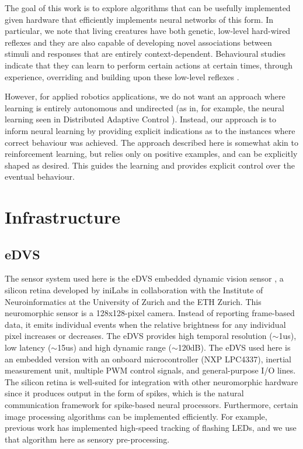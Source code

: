 \documentclass[conference]{IEEEtran}
\begin{document}
The goal of this work is to explore algorithms that can be usefully implemented
given hardware that efficiently implements neural networks of this form.  In
particular, we note that living creatures have both genetic, low-level 
hard-wired reflexes and they are also capable of developing novel associations 
between stimuli and responses that are entirely context-dependent. Behavioural 
studies indicate that they can learn to perform certain actions at certain 
times, through experience, overriding and building upon these low-level 
reflexes \cite{kim2007encoding}. 

However, for applied robotics applications, we do not want an approach where
learning is entirely autonomous and undirected (as in, for example, the neural
learning seen in Distributed Adaptive Control \cite{verschure2012distributed}). 
Instead, our approach is to inform neural learning by providing explicit
indications as to the instances where correct behaviour was achieved.  The 
approach described here is somewhat akin to reinforcement learning, but relies
only on positive examples, and can be explicitly shaped as desired.  This 
guides the learning and provides explicit control over the eventual behaviour. 

\section{Infrastructure}
\label{infrastructure}

\subsection{eDVS}
The sensor system used here is the eDVS embedded dynamic vision 
sensor \cite{conradt2009embedded}, a silicon retina developed by iniLabs in 
collaboration with the Institute of Neuroinformatics at the University of 
Zurich and the ETH Zurich. This neuromorphic sensor is a 128x128-pixel camera. 
Instead of reporting frame-based data, it emits individual events when the 
relative brightness for any individual pixel increases or decreases. The eDVS 
provides high temporal resolution ($\sim$1us), low latency ($\sim$15us) and high dynamic 
range ($\sim$120dB). The eDVS used here is an embedded version with an onboard 
microcontroller (NXP LPC4337), inertial measurement unit, multiple PWM control 
signals, and general-purpose I/O lines. The silicon retina is well-suited for 
integration with other neuromorphic hardware since it produces output in the 
form of spikes, which is the natural communication framework for spike-based 
neural processors. Furthermore, certain image processing algorithms can be 
implemented efficiently. For example, previous work \cite{muller2011miniature} 
has implemented high-speed tracking of flashing LEDs, and we use that algorithm 
here as sensory pre-processing.
\end{document}
